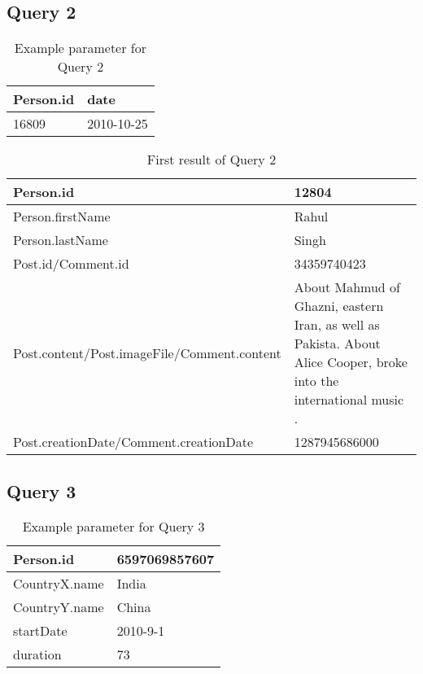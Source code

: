 \subsection{Query 2}

\begin{table}[H]
    \begin{tabular}{|l|l|}
        \hline
        Person.id & date  \\
        \hline
        16809 & 2010-10-25 \\
        \hline
    \end{tabular}
    \caption{Example parameter for Query 2}
\end{table}

\begin{table}[H]
    \begin{tabular}{|p{8cm}|p{8cm}|}
        \hline
        Person.id &  12804\\
        \hline
        Person.firstName &  Rahul\\
        \hline
        Person.lastName &  Singh \\
        \hline
        Post.id/Comment.id & 34359740423 \\
        \hline
        Post.content/Post.imageFile/Comment.content & About Mahmud of Ghazni, eastern Iran, as well as Pakista. About Alice Cooper, broke into the international music . \\
        \hline
        Post.creationDate/Comment.creationDate & 1287945686000 \\ 
        \hline
    \end{tabular}
    \caption{First result of Query 2}
\end{table}

\subsection{Query 3}

\begin{table}[H]
    \begin{tabular}{|l|l|}
        \hline
        Person.id & 6597069857607 \\
        \hline
        CountryX.name & India \\
        \hline
        CountryY.name & China \\
        \hline
        startDate & 2010-9-1 \\
        \hline
        duration & 73 \\
        \hline
    \end{tabular}
    \caption{Example parameter for Query 3}
\end{table}

